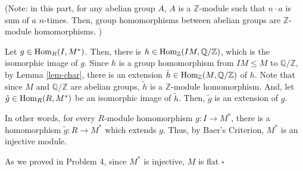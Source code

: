 \documentclass{article}
\newcommand{\qedsq}{\hfill$\square$}
\newcommand{\bbQ}{\mathbb{Q}}
\newcommand{\bbZ}{\mathbb{Z}}
\newcommand{\Hom}{\textnormal{Hom}}
\begin{document}
(Note: in this part, for any abelian group \(A\), \(A\) is a \(\bbZ\)-module such that \(n \cdot a\) is sum of \(a\) \(n\)-times.
Then, group homomorphisms between abelian groups are \(\bbZ\)-module homomorphisms.
)

Let \(g \in \Hom_R(I, M^*)\).
Then, there is \(h \in \Hom_\bbZ(IM, \bbQ / \bbZ)\), which is the isomorphic image of \(g\).
Since \(h\) is a group homomorphism from \(IM \le M\) to \(\bbQ / \bbZ\),
by Lemma \ref{lem-char},
there is an extension \(\tilde{h} \in \Hom_\bbZ(M, \bbQ / \bbZ)\) of \(h\).
Note that since \(M\) and \(\bbQ / \bbZ\) are abelian groups, \(\tilde{h}\) is a \(\bbZ\)-module homomorphism.
And, let \(\tilde{g} \in \Hom_R(R, M^*)\) be an isomorphic image of \(\tilde{h}\).
Then, \(\tilde{g}\) is an extension of \(g\).

In other words, for every \(R\)-module homomorphism \(g: I \to M^*\),
there is a homomorphism \(\tilde{g}: R \to M^*\) which extends \(g\).
Thus, by Baer's Criterion,
\(M^*\) is an injective module.

As we proved in Problem 4, since \(M^*\) is injective, \(M\) is flat
\qedsq
\end{document}
